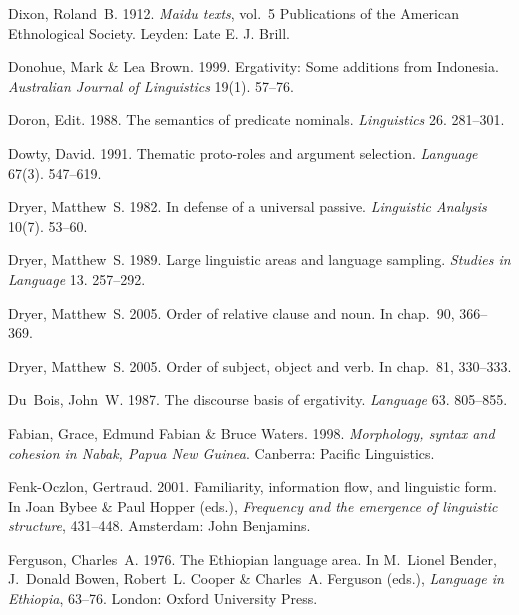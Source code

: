 \documentclass[ number=1
			   ,series=sidl
				,url=http://langsci-press.org/catalog/book/18 
			   ,isbn=978-3-944675-19-0
			   ,output=long   %
			  ]{LSP/langsci}
\begin{document}
\begin{thebibliography}{190}
Dixon, Roland~B. 1912.
\newblock \emph{{M}aidu texts}, vol.~5 Publications of the American
  Ethnological Society.
\newblock Leyden: Late E. J. Brill.

Donohue, Mark \& Lea Brown. 1999.
\newblock Ergativity: {S}ome additions from {I}ndonesia.
\newblock \emph{Australian Journal of Linguistics} 19(1). 57--76.

Doron, Edit. 1988.
\newblock The semantics of predicate nominals.
\newblock \emph{Linguistics} 26. 281--301.

Dowty, David. 1991.
\newblock Thematic proto-roles and argument selection.
\newblock \emph{Language} 67(3). 547--619.

Dryer, Matthew~S. 1982.
\newblock In defense of a universal passive.
\newblock \emph{Linguistic Analysis} 10(7). 53--60.

Dryer, Matthew~S. 1989.
\newblock Large linguistic areas and language sampling.
\newblock \emph{Studies in Language} 13. 257--292.

Dryer, Matthew~S. 2005{}.
\newblock Order of relative clause and noun.
\newblock In  \cite{WALS} chap.~90, 366--369.

Dryer, Matthew~S. 2005{}.
\newblock Order of subject, object and verb.
\newblock In  \cite{WALS} chap.~81, 330--333.

Du~Bois, John~W. 1987.
\newblock The discourse basis of ergativity.
\newblock \emph{Language} 63. 805--855.

Fabian, Grace, Edmund Fabian \& Bruce Waters. 1998.
\newblock \emph{Morphology, syntax and cohesion in {N}abak, {P}apua {N}ew
  {G}uinea}.
\newblock Canberra: Pacific Linguistics.

Fenk-Oczlon, Gertraud. 2001.
\newblock Familiarity, information flow, and linguistic form.
\newblock In Joan Bybee \& Paul Hopper (eds.), \emph{Frequency and the
  emergence of linguistic structure}, 431--448. Amsterdam: John Benjamins.

Ferguson, Charles~A. 1976.
\newblock The {E}thiopian language area.
\newblock In M.~Lionel Bender, J.~Donald Bowen, Robert~L. Cooper \& Charles~A.
  Ferguson (eds.), \emph{Language in {E}thiopia}, 63--76. London: Oxford
  University Press.


\end{thebibliography}
\end{document}
